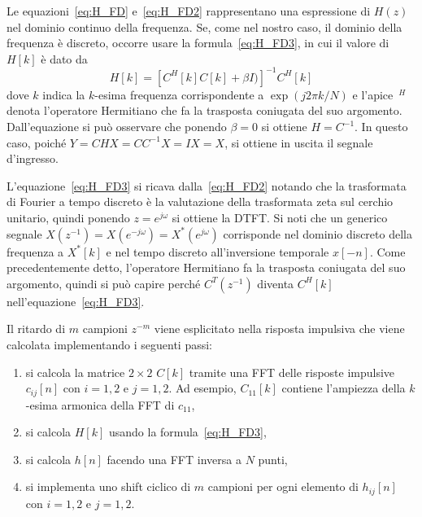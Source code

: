 \documentclass[12pt,a4paper,titlepage]{article}
\begin{document}
Le equazioni~\eqref{eq:H_FD} e~\eqref{eq:H_FD2} rappresentano una espressione di $H(z)$ nel dominio continuo della frequenza. Se, come nel nostro caso, il dominio della frequenza è discreto, occorre usare la formula~\eqref{eq:H_FD3}, in cui il valore di $H[k]$ è dato da
\begin{equation}\label{eq:H_FD3}
H[k] = \left[C^H[k] C[k] + \beta I)\right]^{-1} C^H[k]
\end{equation}
dove $k$ indica la $k$-esima frequenza corrispondente a $\exp(j2\pi k/N)$ e l'apice~$^H$ denota l'operatore Hermitiano che fa la trasposta coniugata del suo argomento. Dall'equazione si può osservare che ponendo $\beta = 0$ si ottiene $H = C^{-1}$. In questo caso, poiché $Y = CHX = C C^{-1} X = IX = X$, si ottiene in uscita il segnale d'ingresso.

L'equazione~\eqref{eq:H_FD3} si ricava dalla~\eqref{eq:H_FD2} notando che la trasformata di Fourier a tempo discreto è la valutazione della trasformata zeta sul cerchio unitario, quindi ponendo $z = e^{j\omega}$ si ottiene la DTFT. Si noti che un generico segnale $X(z^{-1}) = X(e^{-j\omega}) = X^*(e^{j\omega})$ corrisponde nel dominio discreto della frequenza a $X^*[k]$ e nel tempo discreto all'inversione temporale $x[-n]$. Come precedentemente detto, l'operatore Hermitiano fa la trasposta coniugata del suo argomento, quindi si può capire perché $C^T(z^{-1})$ diventa $C^H[k]$ nell'equazione~\eqref{eq:H_FD3}.

Il ritardo di $m$ campioni $z^{-m}$ viene esplicitato nella risposta impulsiva che viene calcolata implementando i seguenti passi:
\begin{enumerate}
\item si calcola la matrice $2 \times 2$ $C[k]$ tramite una FFT delle risposte impulsive $c_{ij}[n]$ con $i = 1, 2$ e $j = 1, 2$. Ad esempio, $C_{11}[k]$ contiene l'ampiezza della $k$-esima armonica della FFT di $c_{11}$,
\item si calcola $H[k]$ usando la formula~\eqref{eq:H_FD3},
\item si calcola $h[n]$ facendo una FFT inversa a $N$ punti,
\item si implementa uno shift ciclico di $m$ campioni per ogni elemento di $h_{ij}[n]$ con $i = 1, 2$ e $j = 1, 2$.
\end{enumerate}
\end{document}
